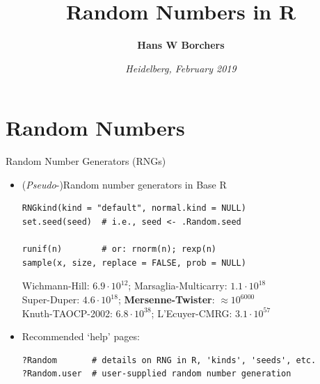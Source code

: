 \documentclass[ignorenonframetext,]{beamer}
\title{Random Numbers in R}
\author{\textbf{Hans W Borchers}}
\date{\emph{Heidelberg, February 2019}}
\begin{document}
\frame{\titlepage}

\hypertarget{random-numbers}{%
\section{Random Numbers}\label{random-numbers}}

\begin{frame}[fragile]{Random Number Generators (RNGs)}
\protect\hypertarget{random-number-generators-rngs}{}

\begin{itemize}
\item
  (\emph{Pseudo}-)Random number generators in Base R

\begin{verbatim}
RNGkind(kind = "default", normal.kind = NULL)
set.seed(seed)  # i.e., seed <- .Random.seed 

runif(n)        # or: rnorm(n); rexp(n)
sample(x, size, replace = FALSE, prob = NULL)
\end{verbatim}

  Wichmann-Hill: \(6.9\cdot10^{12}\); Marsaglia-Multicarry:
  \(1.1\cdot10^{18}\)\\
  Super-Duper: \(4.6\cdot 10^{18}\); \textbf{Mersenne-Twister}:
  \(\approx 10^{6000}\)\\
  Knuth-TAOCP-2002: \(6.8 \cdot 10^{38}\); L'Ecuyer-CMRG:
  \(3.1\cdot 10^{57}\)
\item
  Recommended `help' pages:

\begin{verbatim}
?Random       # details on RNG in R, 'kinds', 'seeds', etc.
?Random.user  # user-supplied random number generation
\end{verbatim}
\end{itemize}

\end{frame}
\end{document}
